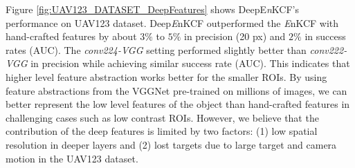 \documentclass[10pt,twocolumn,letterpaper]{article}
\begin{document}

Figure \ref{fig:UAV123_DATASET_DeepFeatures} shows DeepE{\it n}KCF's
performance on UAV123 dataset. Deep{\it E}nKCF outperformed the {\it
  E}nKCF with hand-crafted features by about $3\%$ to $5\%$ in
precision (20 px) and $2\%$ in success rates (AUC). The
\textit{conv224-VGG} setting performed slightly better than
\textit{conv222-VGG} in precision while achieving similar success rate
(AUC). This indicates that higher level feature abstraction works
better for the smaller ROIs. By using feature abstractions from the
VGGNet pre-trained on millions of images, we can better represent the
low level features of the object than hand-crafted features in
challenging cases such as low contrast ROIs. However, we believe that
the contribution of the deep features is limited by two factors: (1)
low spatial resolution in deeper layers and (2) lost targets due to
large target and camera motion in the UAV123 dataset.
\end{document}
